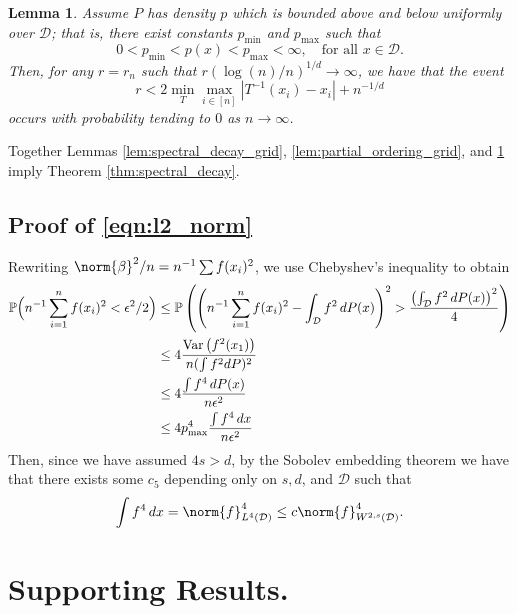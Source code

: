 \documentclass{article}
\newcommand{\abs}[1]{\left \lvert #1 \right \rvert}
\newcommand{\Var}{\mathrm{Var}}
\newcommand{\1}{\mathbf{1}}
\newcommand{\D}{\mathcal{D}}
\newcommand{\Pbb}{\mathbb{P}}
\theoremstyle{alden}
\theoremstyle{aldenthm}
\newtheorem{lemma}{Lemma}
\theoremstyle{definition}
\theoremstyle{remark}
\begin{document}
\begin{lemma}
	\label{lem:matching_distance}
	Assume $P$ has density $p$ which is bounded above and below uniformly over $\D$; that is, there exist constants $p_{\min}$ and $p_{\max}$ such that
	\begin{equation*}
	0 < p_{\min} < p(x) < p_{\max} < \infty, \quad \text{for all $x \in \mathcal{D}$}.
	\end{equation*}
	Then, for any $r = r_n$ such that $r(\log(n)/n)^{1/d} \to \infty$, we have that the event
	\begin{equation*}
	r < 2 \min_{T} \max_{i \in [n]} \abs{T^{-1}(x_i) - x_i} + n^{-1/d}
	\end{equation*}
	occurs with probability tending to $0$ as $n \to \infty$. 
\end{lemma}

Together Lemmas \ref{lem:spectral_decay_grid}, \ref{lem:partial_ordering_grid}, and \ref{lem:matching_distance} imply Theorem \ref{thm:spectral_decay}.

\subsection{Proof of \eqref{eqn:l2_norm}}

Rewriting $\norm{\beta}^2/n = n^{-1} \sum f(x_i)^2$, we use Chebyshev's inequality to obtain
\begin{align*}
\Pbb\Bigl(n^{-1} \sum_{i = 1}^{n} f(x_i)^2 < \epsilon^2/2\Bigr) & \leq \Pbb\left( \left(n^{-1} \sum_{i=1}^{n} f(x_i)^2 - \int_{\D} f^2 \,dP(x)\right)^2 > \frac{\left(\int_{\D} f^2 \,dP(x)\right)^2}{4}\right) \\
& \leq 4 \frac{\Var\left(f^2(x_1)\right)}{n(\int f^2 dP)^2} \\
& \leq 4 \frac{\int f^4 \,dP(x) }{n\epsilon^2} \\
& \leq 4 p_{\max}^4 \frac{\int f^4 \,dx }{n\epsilon^2}
\end{align*}
Then, since we have assumed $4s > d$, by the Sobolev embedding theorem we have that there exists some $c_5$ depending only on $s,d$, and $\D$ such that
\begin{equation*}
\int f^4 \,dx = \norm{f}^4_{L^4(\D)} \leq c \norm{f}_{W^{2,s}(\mathcal{D})}^4.
\end{equation*}
\section{Supporting Results.}
\end{document}
